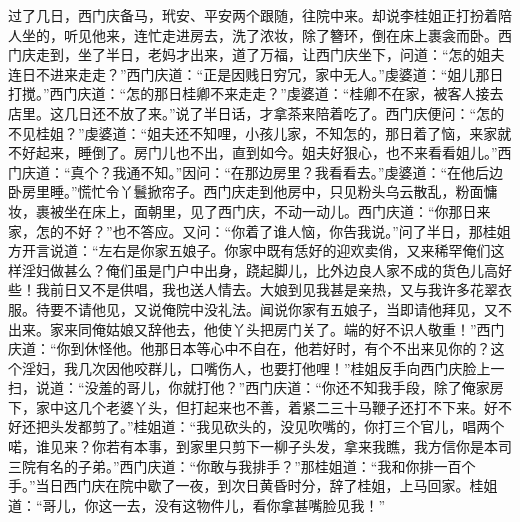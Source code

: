 过了几日，西门庆备马，玳安、平安两个跟随，往院中来。却说李桂姐正打扮着陪人坐的，听见他来，连忙走进房去，洗了浓妆，除了簪环，倒在床上裹衾而卧。西门庆走到，坐了半日，老妈才出来，道了万福，让西门庆坐下，问道：“怎的姐夫连日不进来走走？”西门庆道：“正是因贱日穷冗，家中无人。”虔婆道：“姐儿那日打搅。”西门庆道：“怎的那日桂卿不来走走？”虔婆道：“桂卿不在家，被客人接去店里。这几日还不放了来。”说了半日话，才拿茶来陪着吃了。西门庆便问：“怎的不见桂姐？”虔婆道：“姐夫还不知哩，小孩儿家，不知怎的，那日着了恼，来家就不好起来，睡倒了。房门儿也不出，直到如今。姐夫好狠心，也不来看看姐儿。”西门庆道：“真个？我通不知。”因问：“在那边房里？我看看去。”虔婆道：“在他后边卧房里睡。”慌忙令丫鬟掀帘子。西门庆走到他房中，只见粉头乌云散乱，粉面慵妆，裹被坐在床上，面朝里，见了西门庆，不动一动儿。西门庆道：“你那日来家，怎的不好？”也不答应。又问：“你着了谁人恼，你告我说。”问了半日，那桂姐方开言说道：“左右是你家五娘子。你家中既有恁好的迎欢卖俏，又来稀罕俺们这样淫妇做甚么？俺们虽是门户中出身，跷起脚儿，比外边良人家不成的货色儿高好些！我前日又不是供唱，我也送人情去。大娘到见我甚是亲热，又与我许多花翠衣服。待要不请他见，又说俺院中没礼法。闻说你家有五娘子，当即请他拜见，又不出来。家来同俺姑娘又辞他去，他使丫头把房门关了。端的好不识人敬重！”西门庆道：“你到休怪他。他那日本等心中不自在，他若好时，有个不出来见你的？这个淫妇，我几次因他咬群儿，口嘴伤人，也要打他哩！”桂姐反手向西门庆脸上一扫，说道：“没羞的哥儿，你就打他？”西门庆道：“你还不知我手段，除了俺家房下，家中这几个老婆丫头，但打起来也不善，着紧二三十马鞭子还打不下来。好不好还把头发都剪了。”桂姐道：“我见砍头的，没见吹嘴的，你打三个官儿，唱两个喏，谁见来？你若有本事，到家里只剪下一柳子头发，拿来我瞧，我方信你是本司三院有名的子弟。”西门庆道：“你敢与我排手？”那桂姐道：“我和你排一百个手。”当日西门庆在院中歇了一夜，到次日黄昏时分，辞了桂姐，上马回家。桂姐道：“哥儿，你这一去，没有这物件儿，看你拿甚嘴脸见我！”

